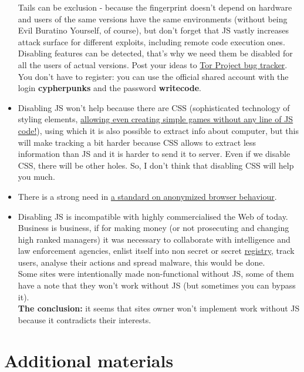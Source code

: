 \documentclass[letterpaper,14pt]{article}
\begin{document}
\begin{itemize}
  Tails can be exclusion - because the fingerprint doesn't depend on hardware and users of the same versions have the same environments (without being Evil Buratino Yourself, of course), but don't forget that JS vastly increases attack surface for different exploits, including remote code execution ones. Disabling features can be detected, that's why we need them be disabled for all the users of actual versions. Post your ideas to \href{https://trac.torproject.org/}{Tor Project bug tracker}. You don't have to register: you can use the official shared account with the login \textbf{cypherpunks} and the password \textbf{writecode}.
\item
  Disabling JS won't help because there are CSS (sophisticated technology of styling elements, \href{https://github.com/i0z/nojsgame}{allowing even creating simple games without any line of JS code!}), using which it is also possible to extract info about computer, but this will make tracking a bit harder because CSS allows to extract less information than JS and it is harder to send it to server. Even if we disable CSS, there will be other holes. So, I don't think that disabling CSS will help you much.
\item
  There is a strong need in \href{https://trac.torproject.org/projects/tor/ticket/14310}{a standard on anonymized browser behaviour}.
\item
  Disabling JS is incompatible with highly commercialised the Web of today.\\
  Business is business, if for making money (or not prosecuting and changing high ranked managers) it was necessary to collaborate with intelligence and law enforcement agencies, enlist itself into non secret or secret \href{http://97-fz.rkn.gov.ru/}{registry}, track users, analyse their actions and spread malware, this would be done.\\
  Some sites were intentionally made non-functional without JS, some of them have a note that they won't work without JS (but sometimes you can bypass it).\\
  \textbf{The conclusion:} it seems that sites owner won't implement work without JS because it contradicts their interests.
\end{itemize}

\section{Additional materials}\label{additional-materials}
\end{document}

